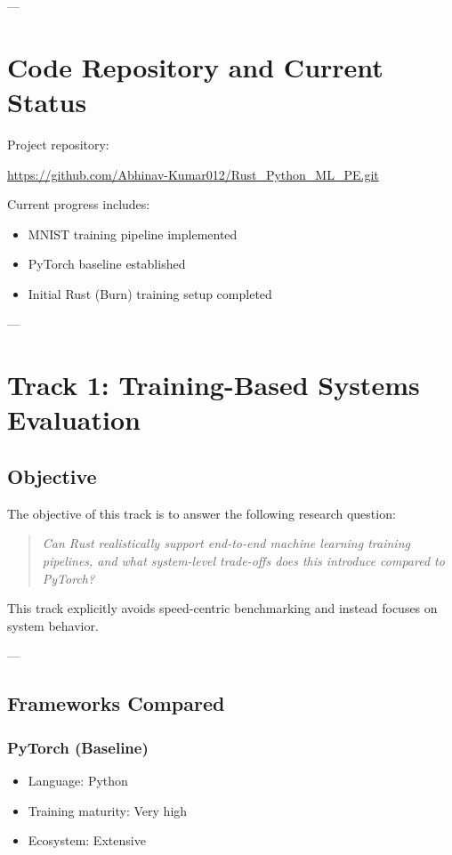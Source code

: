 \documentclass[11pt,a4paper]{article}
\begin{document}
---

\section{Code Repository and Current Status}

Project repository:
\begin{center}
\url{https://github.com/Abhinav-Kumar012/Rust_Python_ML_PE.git}
\end{center}

Current progress includes:
\begin{itemize}
    \item MNIST training pipeline implemented
    \item PyTorch baseline established
    \item Initial Rust (Burn) training setup completed
\end{itemize}

---

\section{Track 1: Training-Based Systems Evaluation}

\subsection{Objective}

The objective of this track is to answer the following research question:

\begin{quote}
\textit{Can Rust realistically support end-to-end machine learning training pipelines, and what system-level trade-offs does this introduce compared to PyTorch?}
\end{quote}

This track explicitly avoids speed-centric benchmarking and instead focuses on system behavior.

---

\subsection{Frameworks Compared}

\subsubsection{PyTorch (Baseline)}
\begin{itemize}
    \item Language: Python
    \item Training maturity: Very high
    \item Ecosystem: Extensive
\end{itemize}
\end{document}

